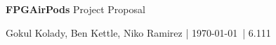 \documentclass[12pt]{article}
\begin{document}
{\Huge \sffamily \textbf{FPGAirPods} Project Proposal}

\vspace{2mm}
{\sffamily Gokul Kolady, Ben Kettle, Niko Ramirez | \today \ | 6.111}
\vspace{5mm}

\begin{multicols}{2}
	\lipsum
\end{multicols}
\end{document}
